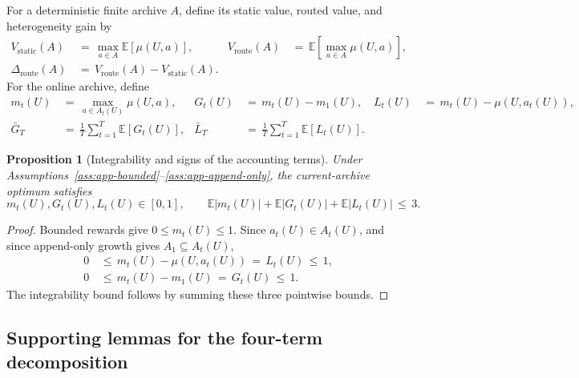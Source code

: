 \documentclass{article} %
\newtheorem{proposition}[theorem]{Proposition}
\begin{document}
For a deterministic finite archive \(A\), define its static value, routed
value, and heterogeneity gain by
\begin{equation}
\begin{aligned}
V_{\mathrm{static}}(A)
&\,=\,\max_{a\in A}\mathbb E[\mu(U,a)], &
V_{\mathrm{route}}(A)
&\,=\,\mathbb E\!\left[\max_{a\in A}\mu(U,a)\right], \\
\Delta_{\mathrm{route}}(A)
&\,=\,V_{\mathrm{route}}(A)-V_{\mathrm{static}}(A).
\end{aligned}
\end{equation}
For the online archive, define
\begin{equation}
\begin{aligned}
m_t(U)
&\,=\,\max_{a\in A_t(U)}\mu(U,a), &
G_t(U)
&\,=\,m_t(U)-m_1(U), &
L_t(U)
&\,=\,m_t(U)-\mu(U,a_t(U)), \\
\bar G_T
&\,=\,\frac1T\sum_{t=1}^T\mathbb E[G_t(U)], &
\bar L_T
&\,=\,\frac1T\sum_{t=1}^T\mathbb E[L_t(U)].
\end{aligned}
\end{equation}

\begin{proposition}[Integrability and signs of the accounting terms]
\label{prop:1}
Under Assumptions~\ref{ass:app-bounded}--\ref{ass:app-append-only}, the current-archive optimum satisfies
\begin{equation}
m_t(U),G_t(U),L_t(U)\in[0,1],
\qquad
\mathbb E|m_t(U)|+\mathbb E|G_t(U)|+\mathbb E|L_t(U)|
\,\leq\,3.
\end{equation}
\end{proposition}

\begin{proof}
Bounded rewards give \(0\leq m_t(U)\leq1\).  Since
\(a_t(U)\in A_t(U)\), and since append-only growth gives
\(A_1\subseteq A_t(U)\),
\begin{equation}
\begin{aligned}
0
&\,\leq\,m_t(U)-\mu(U,a_t(U))
      \,=\,L_t(U)\,\leq\,1, \\
0
&\,\leq\,m_t(U)-m_1(U)
      \,=\,G_t(U)\,\leq\,1.
\end{aligned}
\end{equation}
The integrability bound follows by summing these three pointwise bounds.
\end{proof}

\subsection{Supporting lemmas for the four-term decomposition}
\end{document}
